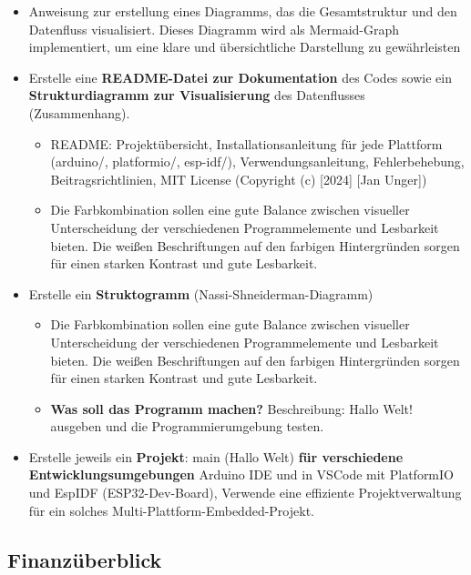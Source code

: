 \documentclass{vorlage-design-main}
\begin{document}
\begin{itemize}
\item
  Anweisung zur erstellung eines Diagramms, das die Gesamtstruktur und
  den Datenfluss visualisiert. Dieses Diagramm wird als Mermaid-Graph
  implementiert, um eine klare und übersichtliche Darstellung zu
  gewährleisten
\item
  Erstelle eine \textbf{README-Datei zur Dokumentation} des Codes sowie
  ein \textbf{Strukturdiagramm zur Visualisierung} des Datenflusses
  (Zusammenhang).

  \begin{itemize}
  
  \item
    README: Projektübersicht, Installationsanleitung für jede Plattform
    (arduino/, platformio/, esp-idf/), Verwendungsanleitung,
    Fehlerbehebung, Beitragsrichtlinien, MIT License (Copyright (c)
    {[}2024{]} {[}Jan Unger{]})
  \item
    Die Farbkombination sollen eine gute Balance zwischen visueller
    Unterscheidung der verschiedenen Programmelemente und Lesbarkeit
    bieten. Die weißen Beschriftungen auf den farbigen Hintergründen
    sorgen für einen starken Kontrast und gute Lesbarkeit.
  \end{itemize}
\item
  Erstelle ein \textbf{Struktogramm} (Nassi-Shneiderman-Diagramm)

  \begin{itemize}
  
  \item
    Die Farbkombination sollen eine gute Balance zwischen visueller
    Unterscheidung der verschiedenen Programmelemente und Lesbarkeit
    bieten. Die weißen Beschriftungen auf den farbigen Hintergründen
    sorgen für einen starken Kontrast und gute Lesbarkeit.
  \item
    \textbf{Was soll das Programm machen?} Beschreibung: Hallo Welt!
    ausgeben und die Programmierumgebung testen.
  \end{itemize}
\item
  Erstelle jeweils ein \textbf{Projekt}: main (Hallo Welt) \textbf{für
  verschiedene Entwicklungsumgebungen} Arduino IDE und in VSCode mit
  PlatformIO und EspIDF (ESP32-Dev-Board), Verwende eine effiziente
  Projektverwaltung für ein solches Multi-Plattform-Embedded-Projekt.
\end{itemize}

\subsection{Finanzüberblick}\label{finanzueberblick}
\end{document}
